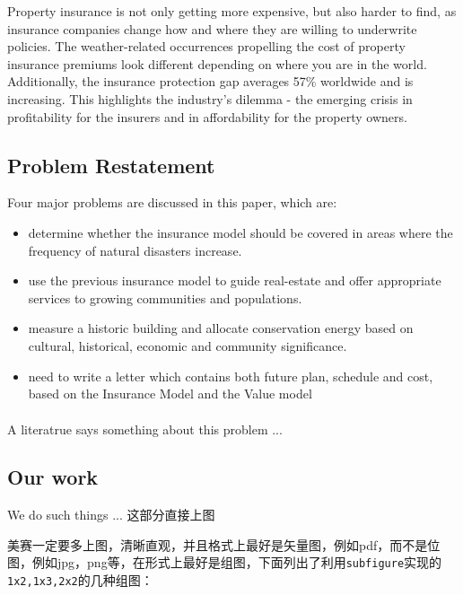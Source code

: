 \documentclass[12pt]{ctexart}
\newcommand{\upcite}[1]{\textsuperscript{\textsuperscript{\cite{#1}}}}%
\begin{document}
Property insurance is not only getting more expensive, 
but also harder to find, 
as insurance companies change how and where they are willing to underwrite policies. 
The weather-related occurrences propelling the cost of property insurance premiums look different depending on where you are in the world. 
Additionally, the insurance protection gap averages 57\% worldwide and is increasing.
This highlights the industry’s dilemma
- the emerging crisis in profitability for the insurers and in affordability for the property owners.


\subsection{Problem Restatement}%
Four major problems are discussed in this paper, which are:
\begin{itemize}
	\item determine whether the insurance model should be covered in areas 
	where the frequency of natural disasters increase.
	\item use the previous insurance model to guide real-estate 
	and offer appropriate services to growing communities and populations.
	\item measure a historic building and allocate conservation energy 
	based on cultural, historical, economic and community significance.
	\item need to write a letter which contains both future plan, schedule and cost,
	based on the Insurance Model and the Value model
\end{itemize}
A literatrue\upcite{kopka2003guide} says something about this problem ...



\subsection{Our work}%
We do such things ...
这部分直接上图

美赛一定要多上图，清晰直观，并且格式上最好是矢量图，例如pdf，而不是位图，例如jpg，png等，在形式上最好是组图，下面列出了利用\verb|subfigure|实现的
\verb|1x2,1x3,2x2|的几种组图：
\end{document}
